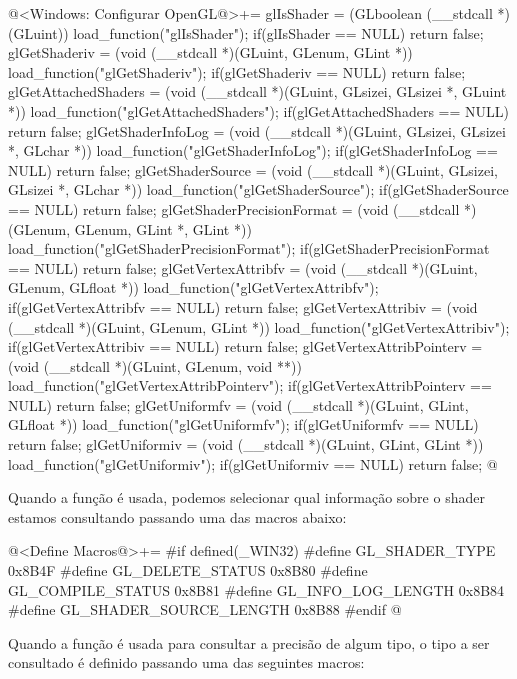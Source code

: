 \iniciocodigo
@<Windows: Configurar OpenGL@>+=
glIsShader = (GLboolean (__stdcall *)(GLuint)) load_function("glIsShader");
if(glIsShader == NULL) return false;
glGetShaderiv = (void (__stdcall *)(GLuint, GLenum, GLint *))
                   load_function("glGetShaderiv");
if(glGetShaderiv == NULL) return false;
glGetAttachedShaders = (void (__stdcall *)(GLuint, GLsizei, GLsizei *, GLuint *))
                         load_function("glGetAttachedShaders");
if(glGetAttachedShaders == NULL) return false;
glGetShaderInfoLog = (void (__stdcall *)(GLuint, GLsizei, GLsizei *, GLchar *))
                         load_function("glGetShaderInfoLog");
if(glGetShaderInfoLog == NULL)  return false;
glGetShaderSource = (void (__stdcall *)(GLuint, GLsizei, GLsizei *, GLchar *))
                       load_function("glGetShaderSource");
if(glGetShaderSource == NULL) return false;
glGetShaderPrecisionFormat = (void (__stdcall *)(GLenum, GLenum, GLint *,
                                                 GLint *))
                                load_function("glGetShaderPrecisionFormat");
if(glGetShaderPrecisionFormat == NULL) return false;
glGetVertexAttribfv = (void (__stdcall *)(GLuint, GLenum, GLfloat *))
                         load_function("glGetVertexAttribfv");
if(glGetVertexAttribfv == NULL) return false;
glGetVertexAttribiv = (void (__stdcall *)(GLuint, GLenum, GLint *))
                        load_function("glGetVertexAttribiv");
if(glGetVertexAttribiv == NULL) return false;
glGetVertexAttribPointerv = (void (__stdcall *)(GLuint, GLenum, void **))
                               load_function("glGetVertexAttribPointerv");
if(glGetVertexAttribPointerv == NULL) return false;
glGetUniformfv = (void (__stdcall *)(GLuint, GLint, GLfloat *))
                     load_function("glGetUniformfv");
if(glGetUniformfv == NULL) return false;
glGetUniformiv = (void (__stdcall *)(GLuint, GLint, GLint *))
                     load_function("glGetUniformiv");
if(glGetUniformiv == NULL) return false;
@
\fimcodigo

Quando a função  é usada, podemos selecionar
qual informação sobre o shader estamos consultando passando uma das
macros abaixo:

\iniciocodigo
@<Define Macros@>+=
#if defined(_WIN32)
#define GL_SHADER_TYPE          0x8B4F
#define GL_DELETE_STATUS        0x8B80
#define GL_COMPILE_STATUS       0x8B81
#define GL_INFO_LOG_LENGTH      0x8B84
#define GL_SHADER_SOURCE_LENGTH 0x8B88
#endif
@
\fimcodigo

Quando a função  é usada para
consultar a precisão de algum tipo, o tipo a ser consultado é definido
passando uma das seguintes macros:

